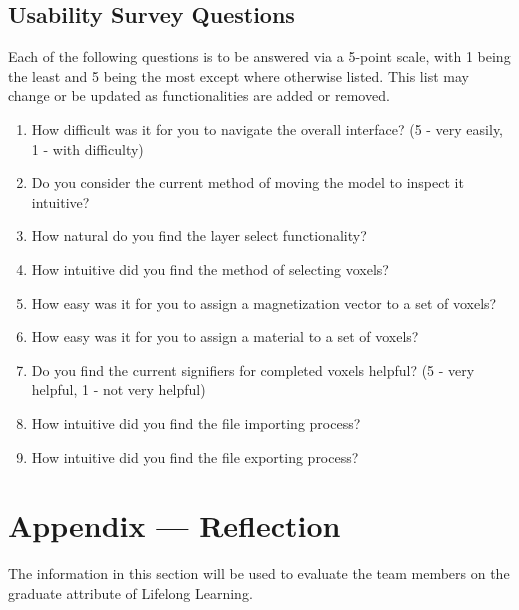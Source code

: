 \documentclass[12pt, titlepage]{article}
\begin{document}
\subsection{Usability Survey Questions}

Each of the following questions is to be answered via a 5-point scale, with 1 being the least and 5 being 
the most except where otherwise listed.
This list may change or be updated as functionalities are added or removed.

\begin{enumerate}
  \item How difficult was it for you to navigate the overall interface? (5 - very easily, 1 - with difficulty)
  \item Do you consider the current method of moving the model to inspect it intuitive?
  \item How natural do you find the layer select functionality?
  \item How intuitive did you find the method of selecting voxels?
  \item How easy was it for you to assign a magnetization vector to a set of voxels?
  \item How easy was it for you to assign a material to a set of voxels?
  \item Do you find the current signifiers for completed voxels helpful? (5 - very helpful, 1 - not very helpful)
  \item How intuitive did you find the file importing process?
  \item How intuitive did you find the file exporting process?
\end{enumerate}

\newpage{}
\section*{Appendix --- Reflection}

The information in this section will be used to evaluate the team members on the
graduate attribute of Lifelong Learning.


\end{document}
